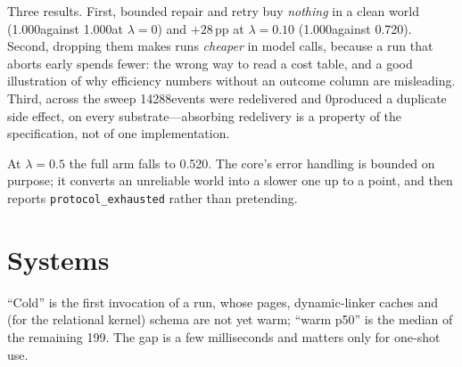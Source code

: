 \documentclass[11pt,a4paper]{article}
\begin{document}
Three results. First, bounded repair and retry buy \emph{nothing} in a clean
world (1.000against 1.000at $\lambda=0$) and
$+28$\,pp at $\lambda=0.10$ (1.000against 0.720). Second, dropping them makes runs
\emph{cheaper} in model calls, because a run that aborts early spends fewer:
the wrong way to read a cost table, and a good illustration of why efficiency
numbers without an outcome column are misleading. Third, across the sweep
14288events were redelivered and 0produced a duplicate
side effect, on every substrate---absorbing redelivery is a property of the
specification, not of one implementation.

At $\lambda=0.5$ the full arm falls to 0.520. The core's error handling is
bounded on purpose; it converts an unreliable world into a slower one up to a
point, and then reports \texttt{protocol\_exhausted} rather than pretending.

\section{Systems}
\label{sec:systems}

\begin{table}[h]\centering\small
\caption{Footprint and performance. \emph{TCB} is the interpreter or binary,
every library it links, and---for the Python-backed kernels---exactly the
standard-library modules they import, not the whole install. Libraries in the
macOS dyld shared cache have no file on disk and count as zero, so \texttt{sh}
and \texttt{asm} are understated by libSystem.}
\label{tab:systems}
\end{table}

``Cold'' is the first invocation of a run, whose pages, dynamic-linker caches
and (for the relational kernel) schema are not yet warm; ``warm p50'' is the
median of the remaining 199. The gap is a few milliseconds and matters only for
one-shot use.
\end{document}
